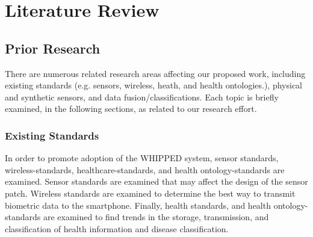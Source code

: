 \chapter{Literature Review}
\label{chap:LitReview}

\section{Prior Research}
\label{sec:priorResearch}
There are numerous related research areas affecting our proposed work, including existing standards (e.g. sensors, wireless, heath, and health ontologies.), physical and synthetic sensors, and data fusion/classifications. Each topic is briefly examined, in the following sections, as related to our research effort.

\subsection{Existing Standards}
\label{sebsec:ExistingStandards}
In order to promote adoption of the WHIPPED system, sensor standards, wireless-standards, healthcare-standards, and health ontology-standards are examined. Sensor standards are examined that may affect the design of the sensor patch. Wireless standards are examined to determine the best way to transmit biometric data to the smartphone. Finally, health standards, and health ontology-standards are examined to find trends in the storage, transmission, and classification of health information and disease classification.


